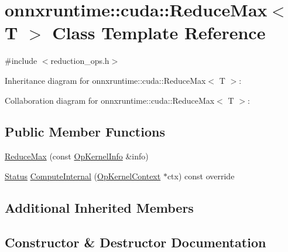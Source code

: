 \hypertarget{classonnxruntime_1_1cuda_1_1ReduceMax}{}\section{onnxruntime\+:\+:cuda\+:\+:Reduce\+Max$<$ T $>$ Class Template Reference}
\label{classonnxruntime_1_1cuda_1_1ReduceMax}


{\ttfamily \#include $<$reduction\+\_\+ops.\+h$>$}



Inheritance diagram for onnxruntime\+:\+:cuda\+:\+:Reduce\+Max$<$ T $>$\+:


Collaboration diagram for onnxruntime\+:\+:cuda\+:\+:Reduce\+Max$<$ T $>$\+:
\subsection*{Public Member Functions}
\begin{DoxyCompactItemize}
\item 
\mbox{\hyperlink{classonnxruntime_1_1cuda_1_1ReduceMax_ad39fd8196ce208cd20dd8a5a166436ff}{Reduce\+Max}} (const \mbox{\hyperlink{classonnxruntime_1_1OpKernelInfo}{Op\+Kernel\+Info}} \&info)
\item 
\mbox{\hyperlink{classonnxruntime_1_1common_1_1Status}{Status}} \mbox{\hyperlink{classonnxruntime_1_1cuda_1_1ReduceMax_ac33cd3745a6dd041abdb98b1e0fb43d4}{Compute\+Internal}} (\mbox{\hyperlink{classonnxruntime_1_1OpKernelContext}{Op\+Kernel\+Context}} $\ast$ctx) const override
\end{DoxyCompactItemize}
\subsection*{Additional Inherited Members}


\subsection{Constructor \& Destructor Documentation}
\mbox{\label{classonnxruntime_1_1cuda_1_1ReduceMax_ad39fd8196ce208cd20dd8a5a166436ff}} 
